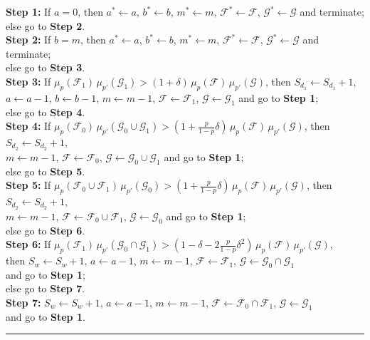 \documentclass[10pt,a4paper]{amsart}
\theoremstyle{remark}
\newcommand{\Fcal}{\mathcal{F}}
\newcommand{\Gcal}{\mathcal{G}}
\begin{document}
\begin{algorithm}
\textbf{Step 1:} If $a=0$, then $a^*\leftarrow a$, $b^*\leftarrow b$, $m^*\leftarrow m$,
$\Fcal^*\leftarrow\Fcal$, $\Gcal^*\leftarrow\Gcal$ and terminate; \\
\hspace{1.3cm} else go to \textbf{Step 2}.\\
\textbf{Step 2:} If $b=m$, then $a^*\leftarrow a$, $b^*\leftarrow b$, $m^*\leftarrow m$,
$\Fcal^*\!\leftarrow\Fcal$, $\Gcal^*\leftarrow\Gcal$ and terminate; \\
\hspace{1.3cm} else go to \textbf{Step 3}.\\
\textbf{Step 3:} If $\mu_p(\Fcal_1)\, \mu_{p'}(\Gcal_1)> (1+\delta)\,\mu_p(\Fcal)\, \mu_{p'}(\Gcal)$,
then $S_{d_1}\leftarrow S_{d_1}+1$, \\
\hspace{1.6cm} $a\leftarrow a-1$, $b\leftarrow b-1$, $m\leftarrow m-1$,
$\Fcal\leftarrow\Fcal_1$, $\Gcal\leftarrow\Gcal_1$ and go to \textbf{Step 1}; \\
\hspace{1.3cm} else go to \textbf{Step 4}.  \\
\textbf{Step 4:} If $\mu_p(\Fcal_0)\, \mu_{p'}(\Gcal_0\cup\Gcal_1)>(1+\frac{p}{1-p}\delta)\,
\mu_p(\Fcal)\, \mu_{p'}(\Gcal)$, then $S_{d_2}\leftarrow S_{d_2}+1$, \\
\hspace{1.6cm} $m\leftarrow m-1$, $\Fcal\leftarrow\Fcal_0$, $\Gcal\leftarrow\Gcal_0\cup\Gcal_1$
and go to \textbf{Step 1}; \\
\hspace{1.3cm} else go to \textbf{Step 5}. \\
\textbf{Step 5:} If $\mu_{p}(\Fcal_0\cup\Fcal_1)\, \mu_{p'}(\Gcal_0)>(1+\frac{p}{1-p}\delta)\,
\mu_p(\Fcal)\, \mu_{p'}(\Gcal)$, then $S_{d_2}\leftarrow S_{d_2}+1$, \\
\hspace{1.6cm} $m\leftarrow m-1$, $\Fcal\leftarrow\Fcal_0\cup \Fcal_1$, $\Gcal\leftarrow\Gcal_0$
and go to \textbf{Step 1}; \\
\hspace{1.3cm} else go to \textbf{Step 6}. \\
\textbf{Step 6:} If $\mu_p(\Fcal_1)\, \mu_{p'}(\Gcal_0\cap\Gcal_1)> (1-\delta-2\frac{p}{1-p}\delta^2)\,
\mu_p(\Fcal)\,\mu_{p'}(\Gcal)$, \\
\hspace{1.6cm} then $S_{w}\leftarrow S_{w}+1$, $a\leftarrow a-1$, $m\leftarrow m-1$, $\Fcal\leftarrow\Fcal_1$,
$\Gcal\leftarrow\Gcal_0\cap\Gcal_1$ \\
\hspace{1.6cm} and go to \textbf{Step 1}; \\
\hspace{1.3cm} else go to \textbf{Step 7}. \\
\textbf{Step 7:} $S_{w}\leftarrow S_{w}+1$, $a\leftarrow a-1$, $m\leftarrow m-1$,
$\Fcal\leftarrow\Fcal_0\cap\Fcal_1$, $\Gcal\leftarrow\Gcal_1$ \\
\hspace{1.6cm} and go to \textbf{Step 1}.
\vspace{0.1cm}
\hrule
\end{algorithm}
\end{document}
